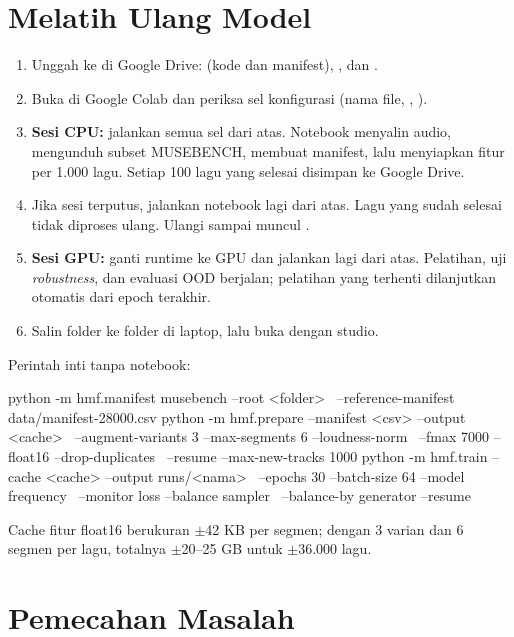 \section{Melatih Ulang Model}
\begin{enumerate}
\item Unggah ke  di Google Drive:  (kode dan manifest), , dan .
\item Buka  di Google Colab dan periksa sel konfigurasi (nama file, , ).
\item \textbf{Sesi CPU:} jalankan semua sel dari atas. Notebook menyalin audio, mengunduh subset MUSEBENCH, membuat manifest, lalu menyiapkan fitur per 1.000 lagu. Setiap 100 lagu yang selesai disimpan ke Google Drive.
\item Jika sesi terputus, jalankan notebook lagi dari atas. Lagu yang sudah selesai tidak diproses ulang. Ulangi sampai muncul .
\item \textbf{Sesi GPU:} ganti runtime ke GPU dan jalankan lagi dari atas. Pelatihan, uji \textit{robustness}, dan evaluasi OOD berjalan; pelatihan yang terhenti dilanjutkan otomatis dari epoch terakhir.
\item Salin folder  ke folder  di laptop, lalu buka dengan studio.
\end{enumerate}
Perintah inti tanpa notebook:
\begin{Perintah}
python -m hmf.manifest musebench --root <folder> \
    --reference-manifest data/manifest-28000.csv
python -m hmf.prepare --manifest <csv> --output <cache> \
    --augment-variants 3 --max-segments 6 --loudness-norm \
    --fmax 7000 --float16 --drop-duplicates \
    --resume --max-new-tracks 1000
python -m hmf.train --cache <cache> --output runs/<nama> \
    --epochs 30 --batch-size 64 --model frequency \
    --monitor loss --balance sampler \
    --balance-by generator --resume
\end{Perintah}
Cache fitur float16 berukuran $\pm$42 KB per segmen; dengan 3 varian dan 6 segmen per lagu, totalnya $\pm$20--25 GB untuk $\pm$36.000 lagu.

\section{Pemecahan Masalah}

